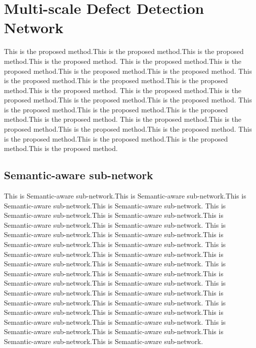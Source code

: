 \documentclass{article}
\begin{document}

\section{Multi-scale Defect Detection Network}
\label{sec:format}

This is the proposed method.This is the proposed method.This is the proposed method.This is the proposed method.
This is the proposed method.This is the proposed method.This is the proposed method.This is the proposed method.
This is the proposed method.This is the proposed method.This is the proposed method.This is the proposed method.
This is the proposed method.This is the proposed method.This is the proposed method.This is the proposed method.
This is the proposed method.This is the proposed method.This is the proposed method.This is the proposed method.
This is the proposed method.This is the proposed method.This is the proposed method.This is the proposed method.
This is the proposed method.This is the proposed method.This is the proposed method.This is the proposed method.

\subsection{Semantic-aware sub-network}
\label{Semantic-aware sub-network}
This is Semantic-aware sub-network.This is Semantic-aware sub-network.This is Semantic-aware sub-network.This is Semantic-aware sub-network.
This is Semantic-aware sub-network.This is Semantic-aware sub-network.This is Semantic-aware sub-network.This is Semantic-aware sub-network.
This is Semantic-aware sub-network.This is Semantic-aware sub-network.This is Semantic-aware sub-network.This is Semantic-aware sub-network.
This is Semantic-aware sub-network.This is Semantic-aware sub-network.This is Semantic-aware sub-network.This is Semantic-aware sub-network.
This is Semantic-aware sub-network.This is Semantic-aware sub-network.This is Semantic-aware sub-network.This is Semantic-aware sub-network.
This is Semantic-aware sub-network.This is Semantic-aware sub-network.This is Semantic-aware sub-network.This is Semantic-aware sub-network.
This is Semantic-aware sub-network.This is Semantic-aware sub-network.This is Semantic-aware sub-network.This is Semantic-aware sub-network.
This is Semantic-aware sub-network.This is Semantic-aware sub-network.This is Semantic-aware sub-network.This is Semantic-aware sub-network.
\end{document}
